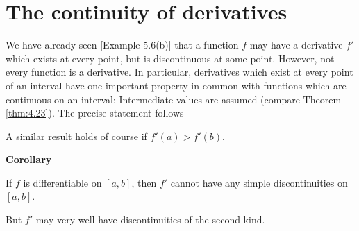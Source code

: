\section{The continuity of derivatives}

We have already seen [Example 5.6(b)] that 
a function $f$ may have a derivative $f'$ which exists at every point, 
but is discontinuous at some point. 
However, not every function is a derivative. 
In particular, derivatives which exist at every point of an interval 
have one important property in common with functions
which are continuous on an interval:
Intermediate values are assumed (compare Theorem \ref{thm:4.23}). 
The precise statement follows

A similar result holds of course if $f'(a) > f'(b)$.

\textbf{Corollary}

If $f$ is differentiable on $[a, b]$, 
then $f'$ cannot have any simple discontinuities on $[a, b]$.

But $f'$ may very well have discontinuities of the second kind.